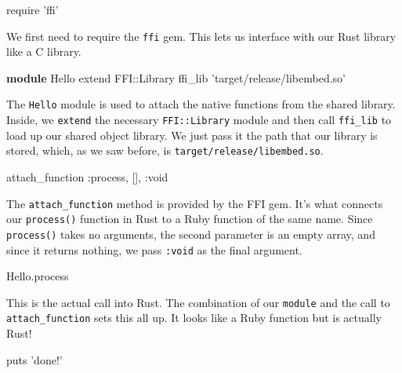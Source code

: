 \documentclass[a4paper,]{book}
\newenvironment{Shaded}{\begin{snugshade}}{\end{snugshade}}
\newcommand{\KeywordTok}[1]{\textcolor[rgb]{0.13,0.29,0.53}{\textbf{{#1}}}}
\newcommand{\DataTypeTok}[1]{\textcolor[rgb]{0.13,0.29,0.53}{{#1}}}
\newcommand{\StringTok}[1]{\textcolor[rgb]{0.31,0.60,0.02}{{#1}}}
\newcommand{\NormalTok}[1]{{#1}}
\begin{document}
\begin{Shaded}
\begin{Highlighting}[]
\NormalTok{require }\StringTok{'ffi'}
\end{Highlighting}
\end{Shaded}

We first need to require the \texttt{ffi} gem. This lets us interface
with our Rust library like a C library.

\begin{Shaded}
\begin{Highlighting}[]
\KeywordTok{module} \DataTypeTok{Hello}
  \NormalTok{extend }\DataTypeTok{FFI}\NormalTok{::}\DataTypeTok{Library}
  \NormalTok{ffi_lib }\StringTok{'target/release/libembed.so'}
\end{Highlighting}
\end{Shaded}

The \texttt{Hello} module is used to attach the native functions from
the shared library. Inside, we \texttt{extend} the necessary
\texttt{FFI::Library} module and then call \texttt{ffi\_lib} to load up
our shared object library. We just pass it the path that our library is
stored, which, as we saw before, is \texttt{target/release/libembed.so}.

\begin{Shaded}
\begin{Highlighting}[]
\NormalTok{attach_function }\StringTok{:process}\NormalTok{, [], }\StringTok{:void}
\end{Highlighting}
\end{Shaded}

The \texttt{attach\_function} method is provided by the FFI gem. It's
what connects our \texttt{process()} function in Rust to a Ruby function
of the same name. Since \texttt{process()} takes no arguments, the
second parameter is an empty array, and since it returns nothing, we
pass \texttt{:void} as the final argument.

\begin{Shaded}
\begin{Highlighting}[]
\DataTypeTok{Hello}\NormalTok{.process}
\end{Highlighting}
\end{Shaded}

This is the actual call into Rust. The combination of our
\texttt{module} and the call to \texttt{attach\_function} sets this all
up. It looks like a Ruby function but is actually Rust!

\begin{Shaded}
\begin{Highlighting}[]
\NormalTok{puts }\StringTok{'done!'}
\end{Highlighting}
\end{Shaded}
\end{document}
